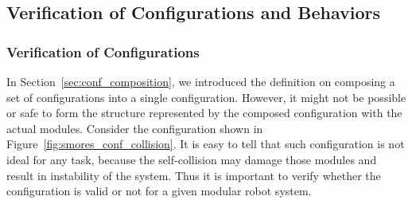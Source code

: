 \documentclass[graybox]{svmult}
\begin{document}
% 
% 
\subsection{ Verification of Configurations and Behaviors}

\subsubsection{Verification of Configurations}\label{sec:verify_conf}
In Section~\ref{sec:conf_composition}, we introduced the definition on composing a set of configurations into a single configuration. However, it might not be possible or safe to form the structure represented by the composed configuration with the actual modules. Consider the configuration shown in Figure~\ref{fig:smores_conf_collision}. It is easy to tell that such configuration is not ideal for any task, because the self-collision may damage those modules and result in instability of the system. Thus it is important to verify whether the configuration is valid or not for a given modular robot system.
\end{document}
